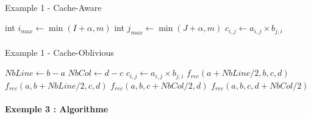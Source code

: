 \documentclass[
  paper=a4,
  ,captions=tableheading
]{scrartcl}
\begin{document}
\hypertarget{algorithm5}{%
\paragraph{}\label{algorithm5}}

\begin{algorithm}[H]
\caption{Example 1 - Cache-Aware}
\begin{algorithmic}[2]
\Statex
 
    \State int $i_{max} \gets \min(I+\alpha, m)$
      \State int $j_{max} \gets \min(J+\alpha, m)$
        \State $c_{i,j} \gets a_{i,j} \times b_{j,i}$
        \EndFor
      \EndFor
    \EndFor
  \EndFor
\end{algorithmic}
\end{algorithm}

\hypertarget{algorithm6}{%
\paragraph{}\label{algorithm6}}

\begin{algorithm}[H]
\caption{Example 1 - Cache-Oblivious}
\begin{algorithmic}[3]
\Statex
{}
  \State $NbLine \gets b-a$
  \State $NbCol \gets d-c$
        \State $c_{i,j} \gets a_{i,j} \times b_{j,i}$
      \EndFor
    \EndFor
  \Else
      \State $f_{rec}(a+NbLine/2, b, c, d)$
      \State $f_{rec}(a, b+NbLine/2, c, d)$
    \Else
      \State $f_{rec}(a, b, c+NbCol/2, d)$
      \State $f_{rec}(a, b, c, d+NbCol/2)$
    \EndIf
  \EndIf
\EndFunction
\end{algorithmic}
\end{algorithm}

\hypertarget{exemple-3-algorithme}{%
\paragraph{Exemple 3 : Algorithme}\label{exemple-3-algorithme}}

\hypertarget{exemple3}{%
\paragraph{}\label{exemple3}}


\end{document}
